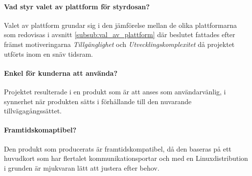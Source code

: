 \documentclass{article}
\begin{document}
        \paragraph{\textrm{Vad styr valet av plattform för styrdosan?}} %
        \label{par:vad_styr_valet}
            Valet av plattform grundar sig i den jämförelse mellan de olika plattformarna som redovisas i avsnitt \ref{subsub:val_av_plattform} där beslutet fattades efter främst motiveringarna \emph{Tillgänglighet} och \emph{Utvecklingskomplexitet} då projektet utförts inom en snäv tidsram.

        \paragraph{\textrm{Enkel för kunderna att använda?}} %
        \label{par:enk}
            Projektet resulterade i en produkt som är att anses som användarvänlig, i synnerhet när produkten sätts i förhållande till den nuvarande tillväga\-gångs\-sättet.

        \paragraph{\textrm{Framtidskomaptibel?}} %
        \label{par:framtidskomaptibel}
            Den produkt som producerats är framtidskompatibel, då den baseras på ett huvudkort som har flertalet kommunikationsportar och med en Linux\-distribution i grunden är mjukvaran lätt att justera efter behov.
      
\end{document}
